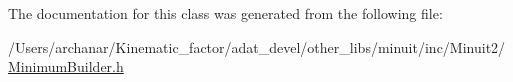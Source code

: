 The documentation for this class was generated from the following file\+:\begin{DoxyCompactItemize}
\item 
/\+Users/archanar/\+Kinematic\+\_\+factor/adat\+\_\+devel/other\+\_\+libs/minuit/inc/\+Minuit2/\mbox{\hyperlink{other__libs_2minuit_2inc_2Minuit2_2MinimumBuilder_8h}{Minimum\+Builder.\+h}}\end{DoxyCompactItemize}
